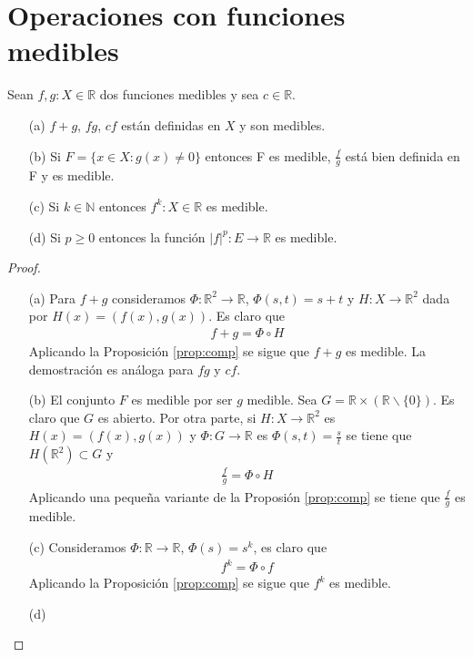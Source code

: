 \section{Operaciones con funciones medibles}
\begin{prop}
Sean $f,g: X \in \mathbb{R}$ dos funciones medibles y sea $c \in \mathbb{R}$.
\begin{enumerate}
    \item[(a)] $f+g$, $fg$, $cf$ están definidas en $X$ y son medibles.
    \item[(b)] Si $F = \{ x \in X : g(x) \not = 0 \}$ entonces F es medible, $\frac{f}{g}$ está bien definida en F y es medible.
    \item[(c)] Si $k \in \mathbb{N}$ entonces $f^k: X \in \mathbb{R}$ es medible.
    \item[(d)] Si $p \ge 0$ entonces la función $|f|^p: E \longrightarrow \mathbb{R}$ es medible.
\end{enumerate}
\end{prop}
\begin{proof}
\begin{enumerate}
    \item[(a)] Para $f + g$ consideramos $\Phi: \mathbb{R}^2 \longrightarrow \mathbb{R}$, $\Phi(s,t) = s + t$ y $H: X \longrightarrow \mathbb{R}^2$ dada por $H(x) = (f(x), g(x))$. Es claro que
    \begin{align*}
        f + g = \Phi \circ{} H
    \end{align*}
    Aplicando la Proposición \ref{prop:comp} se sigue que $f + g$ es medible. La demostración es análoga para $fg$ y $cf$.
    \item[(b)] El conjunto $F$ es medible por ser $g$ medible. Sea $G = \mathbb{R} \times (\mathbb{R} \backslash \{0\})$. Es claro que $G$ es abierto. Por otra parte, si $H: X \longrightarrow \mathbb{R}^2$ es $H(x) = (f(x),g(x))$ y $\Phi:G \longrightarrow \mathbb{R}$ es $\Phi(s,t) = \frac{s}{t}$ se tiene que $H(\mathbb{R}^2) \subset G$ y
    \begin{align*}
        \frac{f}{g} = \Phi \circ{} H
    \end{align*}
    Aplicando una pequeña variante de la Proposión \ref{prop:comp} se tiene que $\frac{f}{g}$ es medible.
    \item[(c)] Consideramos $\Phi: \mathbb{R} \longrightarrow \mathbb{R}$, $\Phi(s) = s^k$, es claro que
    \begin{align*}
        f^k = \Phi \circ{} f
    \end{align*}
    Aplicando la Proposición \ref{prop:comp} se sigue que $f^k$ es medible.
    \item[(d)]
\end{enumerate}
\end{proof}

